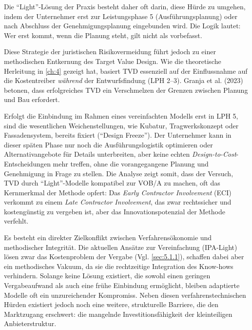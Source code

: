 Die \enquote{Light}-Lösung der Praxis besteht daher oft darin, diese Hürde zu umgehen, indem der Unternehmer erst zur Leistungsphase 5 (Ausführungsplanung) oder nach Abschluss der Genehmigungsplanung eingebunden wird. Die Logik lautet: Wer erst kommt, wenn die Planung steht, gilt nicht als vorbefasst.

Diese Strategie der juristischen Risikovermeidung führt jedoch zu einer methodischen Entkernung des Target Value Design. Wie die theoretische Herleitung in \cref{ch:4} gezeigt hat, basiert \acs{TVD} essenziell auf der Einflussnahme auf die Kostentreiber \textit{während} der Entwurfsfindung (\acs{LPH} 2--3).\autocite[Vgl.][S.~3--4]{ballard_target_2012} Granja et al. (2023) betonen, dass erfolgreiches \acs{TVD} ein Verschmelzen der Grenzen zwischen Planung und Bau erfordert\autocite[Vgl.][S.~3]{granja_modelo_2023}.

Erfolgt die Einbindung im Rahmen eines vereinfachten Modells erst in \acs{LPH} 5, sind die wesentlichen Weichenstellungen, wie Kubatur, Tragwerkskonzept oder Fassadensystem, bereits fixiert (\enquote{Design Freeze}). Der Unternehmer kann in dieser späten Phase nur noch die Ausführungslogistik optimieren oder Alternativangebote für Details unterbreiten, aber keine echten \textit{Design-to-Cost}-Entscheidungen mehr treffen, ohne die vorangegangene Planung und Genehmigung in Frage zu stellen.
Die Analyse zeigt somit, dass der Versuch, \acs{TVD} durch \enquote{Light}-Modelle kompatibel zur \acs{VOB}/A zu machen, oft das Kernmerkmal der Methode opfert: Das \textit{Early Contractor Involvement} (\acs{ECI}) verkommt zu einem \textit{Late Contractor Involvement}, das zwar rechtssicher und kostengünstig zu vergeben ist, aber das Innovationspotenzial der Methode verfehlt.

Es besteht ein direkter Zielkonflikt zwischen Verfahrensökonomie und methodischer Integrität. Die aktuellen Ansätze zur Vereinfachung (\acs{IPA}-Light) lösen zwar das Kostenproblem der Vergabe (Vgl. \cref{sec:5.1.1}), schaffen dabei aber ein methodisches Vakuum, da sie die rechtzeitige Integration des Know-hows verhindern. Solange keine Lösung existiert, die sowohl einen geringen Vergabeaufwand als auch eine frühe Einbindung ermöglicht, bleiben adaptierte Modelle oft ein unzureichender Kompromiss. Neben diesen verfahrenstechnischen Hürden existiert jedoch noch eine weitere, strukturelle Barriere, die den Marktzugang erschwert: die mangelnde Investitionsfähigkeit der kleinteiligen Anbieterstruktur.

